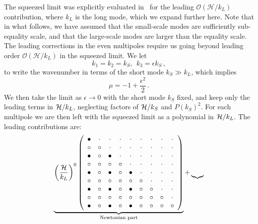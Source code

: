 The squeezed limit was explicitly evaluated in~\cite{Clarkson:2018dwn} for the leading $\mathcal{O}(\mathcal{H}/k_L)$ contribution, where $k_L$ is the long mode, which we expand further here. {Note that in what follows, we have assumed that the small-scale modes are sufficiently sub-equality scale, and that the large-scale modes are larger than the equality scale. The leading corrections in the even multipoles require us going beyond leading order $\mathcal{O}(\mathcal{H}/k_L)$ in the squeezed limit. We let 
\begin{equation}
k_{1}=k_{2}=k_S, ~~k_{3}=\epsilon k_S\,,
\end{equation}
to write the wavenumber in terms of the short mode $k_S\gg k_L$, which implies
\begin{equation}
\mu=-1+\frac{\epsilon^2}{2}\,.
\end{equation}
We then take the limit as $\epsilon\to0$ with the short mode $k_S$ fixed, and keep only the leading terms in $\mathcal{H}/k_L$, neglecting factors of $\mathcal{H}/k_S$ and $P(k_S)^2$.  For each multipole we are then left with the squeezed limit as a polynomial in $\mathcal{H}/k_L$. The leading contributions are:
\begin{equation}
\underbrace{\left(\frac{\mathcal{H}}{k_L}\right)^0 
 \left( \begin {array}{ccccccccc} \bullet &\cdot &\cdot &\cdot &\cdot &\cdot &\cdot &\cdot &\cdot 
\\  \circ &\circ &\cdot &\cdot &\cdot &\cdot &\cdot &\cdot &\cdot \\  \bullet &\circ &\bullet &\cdot &\cdot &\cdot 
&\cdot &\cdot &\cdot \\  \circ &\circ &\circ &\circ &\cdot &\cdot &\cdot &\cdot &\cdot \\  \bullet &\circ &\bullet 
&\circ &\bullet &\cdot &\cdot &\cdot &\cdot \\  \circ &\circ &\circ &\circ &\circ &\circ &\cdot &\cdot &\cdot 
\\  \bullet &\circ &\bullet &\circ &\bullet &\circ &\circ &\cdot &\cdot \\  \circ &\circ &\circ &\circ &\circ &\circ 
&\circ &\circ &\cdot \\  \bullet &\circ &\bullet &\circ &\bullet &\circ &\circ &\circ &\circ \end {array} \right) 
}_{\text{Newtonian part}}
+
\underbrace{
}
\end{equation}}
